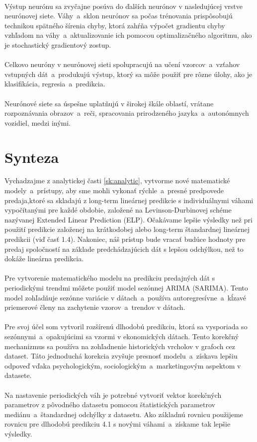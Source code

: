     \\
    Výstup neurónu sa zvyčajne posúva do ďalších neurónov v nasledujúcej vrstve neurónovej siete. Váhy~a~sklon
    neurónov sa počas trénovania prispôsobujú technikou spätného šírenia chyby, ktorá zahŕňa výpočet gradientu chyby
    vzhľadom na váhy~a~aktualizovanie ich pomocou optimalizačného algoritmu, ako je stochastický gradientový zostup.\\
    \\
    Celkovo neuróny v neurónovej sieti spolupracujú na učení vzorcov~a~vzťahov vstupných dát~a~produkujú výstup,
    ktorý sa môže použiť pre rôzne úlohy, ako je klasifikácia, regresia~a~predikcia.\\
    \\
    Neurónové siete sa úspešne uplatňujú v širokej škále oblastí, vrátane rozpoznávania obrazov~a~reči, spracovania
    prirodzeného jazyka~a~autonómnych vozidiel, medzi inými.
    \section{Synteza}
    Vychadzajme z analytickej časti \ref{sk:analytic}, vytvorme nové matematické modely~a~prístupy, aby sme mohli
    vykonať rýchle~a~presné predpovede predaja,ktoré sa skladajú z long-term lineárnej predikcie s individuálnymi
    váhami vypočítanými pre každé obdobie, založené na Levinson-Durbinovej schéme nazývanej Extended Linear Prediction
    (ELP). Očakávame lepšie výsledky než pri použití predikcie založenej na krátkodobej alebo long-term štandardnej
    lineárnej predikcii (viď časť 1.4). Nakoniec, náš prístup bude vracať budúce hodnoty pre predaj spoločností na základe
    predchádzajúcich dát s lepšou odchýlkou, než to dokáže lineárna predikcia.\\
    \\
    Pre vytvorenie matematického modelu na predikciu predajných dát s periodickými trendmi môžete použiť model
    sezónnej ARIMA (SARIMA). Tento model zohľadňuje sezónne variácie v dátach~a~používa autoregresívne~a~kĺzavé
    priemerové členy na zachytenie vzorov~a~trendov v dátach.\\
    \\
    Pre svoj účel som vytvoril rozšírenú dlhodobú predikciu, ktorá sa vysporiada so sezónnymi~a~opakujúcimi sa vzormi
    v ekonomických dátach. Tento korekčný mechanizmus sa používa na zohľadnenie historických vrcholov v grafoch cez dataset.
    Táto jednoduchá korekcia zvyšuje presnosť modelu~a~získava lepšiu odpoveď vďaka psychologickým,
    sociologickým~a~marketingovým aspektom v datasete.\\
    \\
    Na nastavenie periodických váh je potrebné vytvoriť vektor korekčných parametrov z pôvodného datasetu pomocou
    štatistických parametrov mediánu~a~štandardnej odchýlky z datasetu. Ako základnú rovnicu použijeme rovnicu pre
    dlhodobú predikciu 4.1 s novými váhami~a~získame tak lepšie výsledky.
